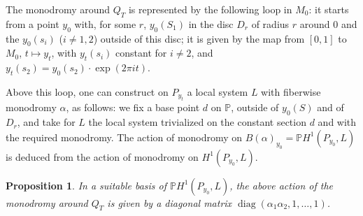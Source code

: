 \documentclass[12pt,a4paper]{article}
\theoremstyle{plain}
\newtheorem{proposition}[theorem]{Proposition}
\theoremstyle{definition}
\theoremstyle{remark}
\DeclareMathOperator{\diag}{diag}
\newcommand{\PP}{\mathbb{P}}
\numberwithin{equation}{section}
\providecommand{\PP}{\mathbb{P}}
\begin{document}
The monodromy around $Q_T$ is represented by the following loop in $M_0$: it starts from a point $y_0$ with, for some $r$, $y_0(S_1)$ in the disc $D_r$ of radius $r$ around $0$ and the $y_0(s_i)$ ($i \neq 1, 2$) outside of this disc; it is given by the map from $[0, 1]$ to $M_0$, $t \mapsto y_t$, with $y_t(s_i)$ constant for $i \neq 2$, and $y_t(s_2) = y_0(s_2) \cdot \exp(2\pi i t)$.

Above this loop, one can construct on $P_{y_t}$ a local system $L$ with fiberwise monodromy $\alpha$, as follows: we fix a base point $d$ on $\PP$, outside of $y_0(S)$ and of $D_r$, and take for $L$ the local system trivialized on the constant section $d$ and with the required monodromy. The action of monodromy on $B(\alpha)_{y_0} = \PP H^1(P_{y_0}, L)$ is deduced from the action of monodromy on $H^1(P_{y_0}, L)$.

\begin{proposition}\label{prop:9.2}
In a suitable basis of $\PP H^1(P_{y_0}, L)$, the above action of the monodromy around $Q_T$ is given by a diagonal matrix $\diag(\alpha_1 \alpha_2, 1, \ldots, 1)$.
\end{proposition}
\end{document}
